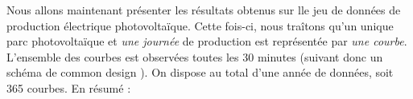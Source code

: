 \bigskip

Nous allons maintenant présenter les résultats obtenus sur lle jeu de données de production électrique photovoltaïque. Cette fois-ci, nous traîtons qu'un unique parc photovoltaïque et \emph{une journée} de production est représentée par \emph{une courbe}. L'ensemble des courbes est observées toutes les 30 minutes (suivant donc un schéma de \og common design \fg). On dispose au total d'une année de données, soit 365 courbes. En résumé :

\bigskip

